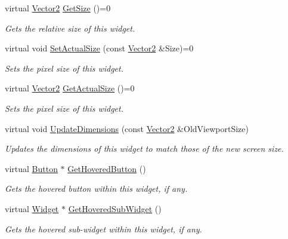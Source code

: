 \begin{DoxyCompactItemize}
virtual \hyperlink{classphys_1_1Vector2}{Vector2} \hyperlink{classphys_1_1UI_1_1Widget_a07039c19e57de314147ce066417da0a2}{GetSize} ()=0
\begin{DoxyCompactList}\small\item\em Gets the relative size of this widget. \item\end{DoxyCompactList}\item 
virtual void \hyperlink{classphys_1_1UI_1_1Widget_acda63a62fa158d5fe00c86f50e5c120d}{SetActualSize} (const \hyperlink{classphys_1_1Vector2}{Vector2} \&Size)=0
\begin{DoxyCompactList}\small\item\em Sets the pixel size of this widget. \item\end{DoxyCompactList}\item 
virtual \hyperlink{classphys_1_1Vector2}{Vector2} \hyperlink{classphys_1_1UI_1_1Widget_af3a685621ed220748c0940ea38c96ed2}{GetActualSize} ()=0
\begin{DoxyCompactList}\small\item\em Sets the pixel size of this widget. \item\end{DoxyCompactList}\item 
virtual void \hyperlink{classphys_1_1UI_1_1Widget_acbda7003549c6caac46078c034657929}{UpdateDimensions} (const \hyperlink{classphys_1_1Vector2}{Vector2} \&OldViewportSize)
\begin{DoxyCompactList}\small\item\em Updates the dimensions of this widget to match those of the new screen size. \item\end{DoxyCompactList}\item 
virtual \hyperlink{classphys_1_1UI_1_1Button}{Button} $\ast$ \hyperlink{classphys_1_1UI_1_1Widget_ab563c13db418e4c3ff0a0dd766550251}{GetHoveredButton} ()
\begin{DoxyCompactList}\small\item\em Gets the hovered button within this widget, if any. \item\end{DoxyCompactList}\item 
virtual \hyperlink{classphys_1_1UI_1_1Widget}{Widget} $\ast$ \hyperlink{classphys_1_1UI_1_1Widget_a38764b73bc6087e2611660735840ba3f}{GetHoveredSubWidget} ()
\begin{DoxyCompactList}\small\item\em Gets the hovered sub-\/widget within this widget, if any. \item\end{DoxyCompactList}\item 

\end{DoxyCompactItemize}
